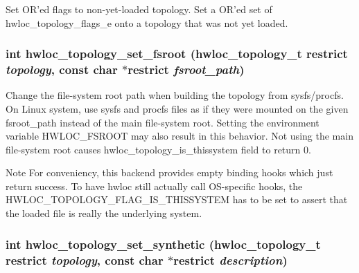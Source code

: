 Set OR'ed flags to non-\/yet-\/loaded topology. Set a OR'ed set of hwloc\_\-topology\_\-flags\_\-e onto a topology that was not yet loaded. \hypertarget{group__hwlocality__configuration_ga45a6b5dd59be36879a64a7f73e0363c2}{
\subsubsection[{hwloc\_\-topology\_\-set\_\-fsroot}]{\setlength{\rightskip}{0pt plus 5cm}int hwloc\_\-topology\_\-set\_\-fsroot ({\bf hwloc\_\-topology\_\-t} restrict {\em topology}, \/  const char $\ast$restrict {\em fsroot\_\-path})}}
\label{group__hwlocality__configuration_ga45a6b5dd59be36879a64a7f73e0363c2}


Change the file-\/system root path when building the topology from sysfs/procfs. On Linux system, use sysfs and procfs files as if they were mounted on the given {\ttfamily fsroot\_\-path} instead of the main file-\/system root. Setting the environment variable HWLOC\_\-FSROOT may also result in this behavior. Not using the main file-\/system root causes hwloc\_\-topology\_\-is\_\-thissystem field to return 0.

\begin{DoxyNote}{Note}
For conveniency, this backend provides empty binding hooks which just return success. To have hwloc still actually call OS-\/specific hooks, the HWLOC\_\-TOPOLOGY\_\-FLAG\_\-IS\_\-THISSYSTEM has to be set to assert that the loaded file is really the underlying system. 
\end{DoxyNote}
\hypertarget{group__hwlocality__configuration_ga5c11f6e454ebd5f4089670269e097a1e}{
\subsubsection[{hwloc\_\-topology\_\-set\_\-synthetic}]{\setlength{\rightskip}{0pt plus 5cm}int hwloc\_\-topology\_\-set\_\-synthetic ({\bf hwloc\_\-topology\_\-t} restrict {\em topology}, \/  const char $\ast$restrict {\em description})}}
\label{group__hwlocality__configuration_ga5c11f6e454ebd5f4089670269e097a1e}


